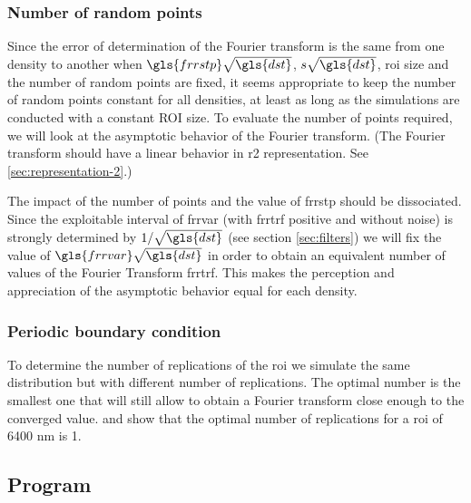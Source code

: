 {\subsubsection{Number of random points}

Since the error of determination of the Fourier transform is the same from one density to another when \( \gls{frrstp} \sqrt{\gls{dst}} \), \( s \sqrt{\gls{dst}} \), \gls{roi} size and the number of random points are fixed, it seems appropriate to keep the number of random points constant for all densities, at least as long as the simulations are conducted with a constant ROI size.
To evaluate the number of points required, we will look at the asymptotic behavior of the Fourier transform.
(The Fourier transform should have a linear behavior in \gls{r2} representation. See \ref{sec:representation-2}.)

The impact of the number of points and the value of \gls{frrstp} should be dissociated.
Since the exploitable interval of \gls{frrvar} (with \gls{frrtrf} positive and without noise) is strongly determined by \( 1 / \sqrt{\gls{dst}} \) (see section \ref{sec:filters}) we will fix the value of \( \gls{frrvar} \sqrt{\gls{dst}} \) in order to obtain an equivalent number of values of the Fourier Transform \gls{frrtrf}.
This makes the perception and appreciation of the asymptotic behavior equal for each density.

\subsubsection{Periodic boundary condition}

To determine the number of replications of the \gls{roi} we simulate the same distribution but with different number of replications.
The optimal number is the smallest one that will still allow to obtain a Fourier transform close enough to the converged value.
 and  show that the optimal number of replications for a \gls{roi} of 6400 nm is 1.

%
%

\subsection{Program}

}
